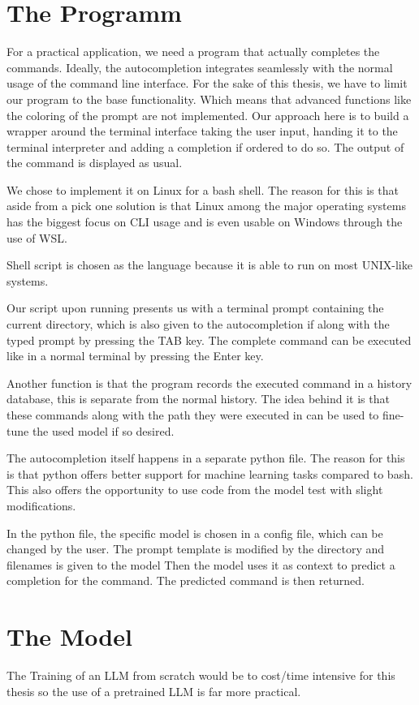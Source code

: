 
\section{The Programm}
For a practical application, we need a program that actually completes the commands.
Ideally, the autocompletion integrates seamlessly with the normal usage of the command line interface. For the sake of this thesis, we have to limit our program to the base functionality. Which means that advanced functions like the coloring of the prompt are not implemented. Our approach here is to build a wrapper around the terminal interface taking the user input, handing it to the terminal interpreter and adding a completion if ordered to do so. The output of the command is displayed as usual.


We chose to implement it on Linux for a bash shell. The reason for this is that aside from a pick one solution is that Linux among the major operating systems has the biggest focus on CLI usage and is even usable on Windows through the use of WSL.
 

Shell script is chosen as the  language because it is able to run on most UNIX-like systems.


Our script upon running presents us with a terminal prompt containing the current directory, which is also given to the autocompletion if along with the typed prompt by pressing the TAB key. The complete command can be executed like in a normal terminal by pressing the Enter key. 

Another function is that the program records the executed command in a history database, this is separate from the normal history. The idea behind it is that these commands along with the path they were executed in can be used to fine-tune the used model if so desired.


The autocompletion itself happens in a separate python file. The reason for this is that python offers better support for machine learning tasks compared to bash. This also offers the opportunity to use code from the model test with slight modifications.

In the python file, the specific model is chosen in a config file, which can be changed by the user.
The prompt template is modified by the directory and filenames is given to the model
Then the model uses it as context to predict  a completion for the command.
The predicted command is then returned.



\section{The Model}\raggedbottom
The Training of an LLM from scratch would be to cost/time intensive for this thesis so the use of a pretrained LLM is far more practical.

